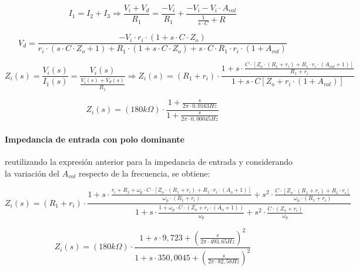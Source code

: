 \begin{equation*}
	I_1 = I_2 + I_3 \Rightarrow
	\frac{V_i + V_d}{R_1} = 
	\frac{-V_i}{R_1} + \frac{- V_i - V_i \cdot A_{vol}}{\frac{1}{s \cdot C} + R}
\end{equation*}

\begin{equation*}
	V_d = \frac{- V_i \cdot r_i \cdot ( 1 + s \cdot C \cdot Z_o)}{r_i \cdot(s \cdot C \cdot Z_o + 1) + R_1 \cdot (1 + s \cdot C \cdot Z_o) + s \cdot C \cdot R_1 \cdot r_i \cdot (1 + A_{vol})}
\end{equation*}

\begin{equation*}
	Z_i(s) = \frac{V_i(s)}{I_1(s)} = \frac{V_i(s)}{\frac{V_i(s) + V_d(s)}{R_1}}
	\Rightarrow
	Z_i(s) = (R_1 + r_i) \cdot \frac{1 + s \cdot \frac{C \cdot \left[ Z_o \cdot (R_1 + r_i) + R_1 \cdot r_i \cdot (A_{vol} + 1) \right]}{R_1 + r_i}}{1 + s \cdot C \left[ Z_o + r_i \cdot ( 1 + A_{vol}) \right]}
\end{equation*}

\begin{equation}
	Z_i(s) = (180k \Omega) \cdot \frac{1 + \frac{s}{2 \pi \cdot 0,0163Hz}}{1 + \frac{s}{2 \pi \cdot 0,00045Hz}}
	\label{eq:integrador_impedancia_avol_finito}
\end{equation}

\paragraph*{Impedancia de entrada con polo dominante} reutilizando la expresi\'on anterior para la impedancia de entrada y considerando la variaci\'on del $A_{vol}$ respecto de la frecuencia, se obtiene:

\begin{equation*}
	Z_i(s) = (R_1 + r_i) \cdot \frac{1 + s \cdot \frac{r_i + R_1 + \omega_p \cdot C \cdot \left[ Z_o \cdot ( R_1 + r_i ) + R_1 \cdot r_i \cdot (A_o + 1) \right]}{\omega_p \cdot (R_1 +r_i)} + s^{2} \cdot \frac{C \cdot \left[ Z_o \cdot (R_1 + r_i) + R_1 \cdot r_i \right]}{\omega_p \cdot (R_1 + r_i)}}{1 + s \cdot \frac{1 + \omega_p \cdot C \cdot (Z_o + r_i \cdot ( A_o + 1 ) )}{\omega_p} + s^{2} \cdot \frac{C \cdot(Z_o + r_i)}{\omega_p}}
\end{equation*}

\begin{equation*}
	Z_i(s) = (180k \Omega) \cdot \frac{1 + s \cdot 9,723 + \left( \frac{s}{2 \pi \cdot 493,65Hz} \right)^{2}	}{1 + s \cdot 350,0045 + \left(\frac{s}{2 \pi \cdot 82,58Hz} \right)^{2}}
\end{equation*}

